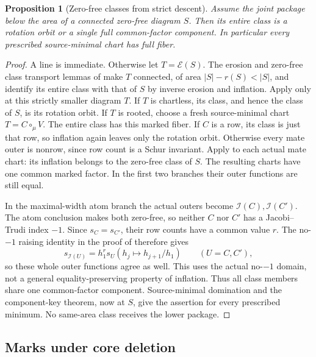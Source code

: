 \documentclass[11pt,a4paper]{amsart}
\numberwithin{equation}{section}
\theoremstyle{plain}
\newtheorem{proposition}[theorem]{Proposition}
\theoremstyle{definition}
\begin{document}
\begin{proposition}[Zero-free classes from strict descent]\label{prop:core-full}
Assume the joint package below the area of a connected zero-free diagram \(S\).
Then its entire class is a rotation orbit or a single full common-factor
component.  In particular every prescribed source-minimal chart has full fiber.
\end{proposition}
\begin{proof}
A line is immediate.  Otherwise let \(T=\mathcal E(S)\).  The erosion
and zero-free class transport lemmas of \cite{Shields2026Inflation}
make \(T\) connected, of area \(|S|-r(S)<|S|\), and identify its
entire class with that of \(S\) by inverse erosion and inflation.
Apply  only at this strictly smaller diagram \(T\).
If \(T\) is chartless, its class, and hence the class of \(S\), is its
rotation orbit.  If \(T\) is rooted, choose a fresh source-minimal chart
\(T=C\circ_\mu V\).  The entire class has this marked fiber.
If \(C\) is a row, its class is just that row, so inflation again leaves
only the rotation orbit.  Otherwise every mate outer is nonrow, since
row count is a Schur invariant.  Apply
\cite[inflation-of-legal-charts lemma]{Shields2026Inflation} to each
actual mate chart: its inflation belongs to the zero-free class of \(S\).
The resulting charts have one common marked factor.  In the first two
branches their outer functions are still equal.

In the maximal-width atom branch the actual outers become
\(\mathcal I(C),\mathcal I(C')\).  The atom conclusion makes both
zero-free, so neither \(C\) nor \(C'\) has a Jacobi--Trudi index
\(-1\).  Since \(s_C=s_{C'}\), their row counts have a common value \(r\).
The no-\(-1\) raising identity in the proof of
\cite[zero-free class transport lemma]{Shields2026Inflation} therefore gives
\[
 s_{\mathcal I(U)}
   =h_1^r s_U(h_j\mapsto h_{j+1}/h_1)
 \qquad(U=C,C'),
\]
so these whole outer functions agree as well.  This uses the actual
no-\(-1\) domain, not a general equality-preserving property of inflation.
Thus all class members share one common-factor component.
Source-minimal domination and the component-key theorem, now at \(S\),
give the assertion for every prescribed minimum.  No same-area class
receives the lower package.
\end{proof}

\subsection{Marks under core deletion}
\end{document}
